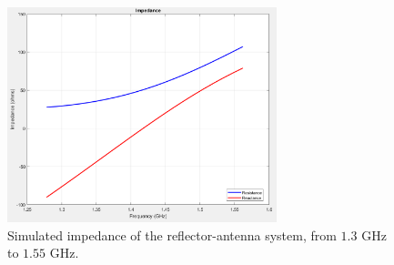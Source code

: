 \documentclass[12pt]{article}
\begin{document}
    \begin{figure}
	    \centering
	    \includegraphics[width=0.7\textwidth]{plots/impedance-sim.png}
	    \caption{Simulated impedance of the reflector-antenna system, from $1.3$ GHz to $1.55$ GHz. } 
	    \label{fig:impedance}
    \end{figure}
    
\end{document}
